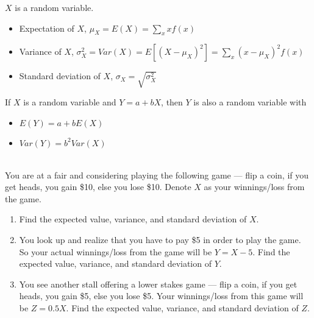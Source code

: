 \documentclass{./../../Latex/handout}
\begin{document}
\thispagestyle{plain}
\begin{center}
\end{center}	
$X$ is a random variable. \vspace{-1em}
\begin{itemize}
  \item Expectation of $X$, $\mu_X = E(X) = \sum_{x} x f(x) $
  \item Variance of $X$, $\sigma^2_X = Var(X) = E[(X-\mu_X)^2] = \sum_{x} (x-\mu_X)^2 f(x) $
  \item Standard deviation of $X$, $\sigma_X = \sqrt{\sigma_X^2}$
\end{itemize}
If $X$ is a random variable and $Y=a+bX$, then $Y$ is also a random variable with \vspace{-1em}
\begin{itemize}
\item $ E(Y) = a + b E(X)$ 
\item $Var(Y) = b^2 Var(X) $ \\~\\
\end{itemize}

You are at a fair and considering playing the following game --- flip a coin, if you get heads, you gain \$10, else you lose \$10. Denote $X$ as your winnings/loss from the game.
  \begin{enumerate}
  \item Find the expected value, variance, and standard deviation of $X$.  \\ \vspace{10cm} 
  
  \item You look up and realize that you have to pay \$5 in order to play the game. So your actual winnings/loss from the game will be $Y=X-5$. Find the expected value, variance, and standard deviation of $Y$. \\ \vspace{9cm} 
   
  \item You see another stall offering a lower stakes game --- flip a coin, if you get heads, you gain \$5, else you lose \$5. Your winnings/loss from this game will be $Z=0.5X$. Find the expected value, variance, and standard deviation of $Z$. 
  \end{enumerate}
\end{document}
